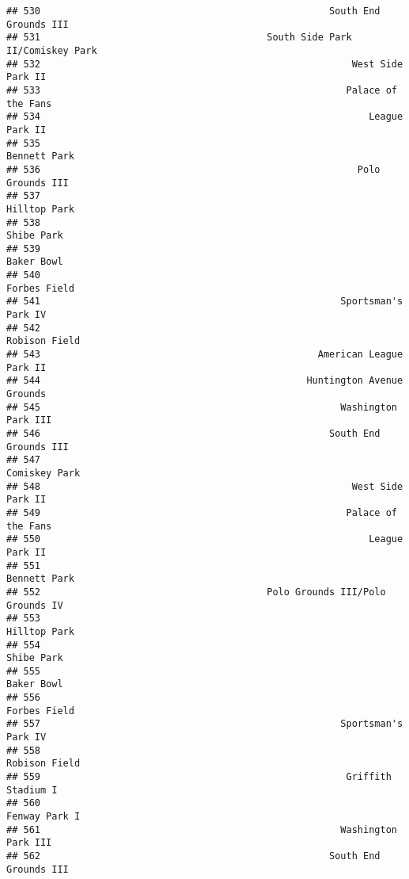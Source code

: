 \documentclass[]{article}
\begin{document}
\begin{verbatim}
## 530                                                   South End Grounds III
## 531                                        South Side Park II/Comiskey Park
## 532                                                       West Side Park II
## 533                                                      Palace of the Fans
## 534                                                          League Park II
## 535                                                            Bennett Park
## 536                                                        Polo Grounds III
## 537                                                            Hilltop Park
## 538                                                              Shibe Park
## 539                                                              Baker Bowl
## 540                                                            Forbes Field
## 541                                                     Sportsman's Park IV
## 542                                                           Robison Field
## 543                                                 American League Park II
## 544                                               Huntington Avenue Grounds
## 545                                                     Washington Park III
## 546                                                   South End Grounds III
## 547                                                           Comiskey Park
## 548                                                       West Side Park II
## 549                                                      Palace of the Fans
## 550                                                          League Park II
## 551                                                            Bennett Park
## 552                                        Polo Grounds III/Polo Grounds IV
## 553                                                            Hilltop Park
## 554                                                              Shibe Park
## 555                                                              Baker Bowl
## 556                                                            Forbes Field
## 557                                                     Sportsman's Park IV
## 558                                                           Robison Field
## 559                                                      Griffith Stadium I
## 560                                                           Fenway Park I
## 561                                                     Washington Park III
## 562                                                   South End Grounds III

\end{verbatim}
\end{document}
